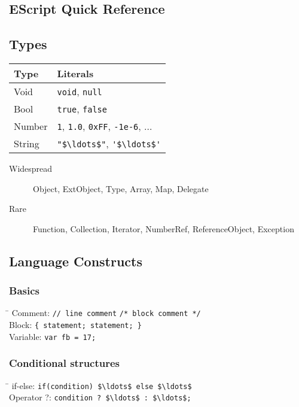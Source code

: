 \documentclass[paper=A4,paper=landscape,pagesize,9pt,DIV=30]{scrartcl}
\title{\doctitle}
\author{\docauthor}
\date{\today}
\def\doctitle{EScript Quick Reference}
\begin{document}
\begin{multicols}{3}
\section*{\doctitle}
\subsection*{Types}
\begin{tabular}{ll}
\toprule
Type		& Literals \\
\midrule
Void		& \lstinline!void!, \lstinline!null! \\
Bool		& \lstinline!true!, \lstinline!false! \\
Number		& \lstinline!1!, \lstinline!1.0!, \lstinline!0xFF!, \lstinline!-1e-6!, $\ldots$ \\
String		& \lstinline!"$\ldots$"!, \lstinline!'$\ldots$'! \\
\bottomrule
\end{tabular}
\begin{description}
	\item[Widespread] Object, ExtObject, Type, Array, Map, Delegate
	\item[Rare] Function, Collection, Iterator, NumberRef, ReferenceObject, Exception
\end{description}
\subsection*{Language Constructs}
\subsubsection*{Basics}
\begin{tabbing}
\hspace{1.75cm}\=\kill
Comment:		\>\lstinline!// line comment! \lstinline!/* block comment */! \\
Block:			\>\lstinline!{ statement; statement; }! \\
Variable:		\>\lstinline!var fb = 17;!
\end{tabbing}
\subsubsection*{Conditional structures}
\begin{tabbing}
\hspace{1.75cm}\=\kill
if-else:		\>\lstinline!if(condition) $\ldots$ else $\ldots$! \\
Operator ?: 	\>\lstinline!condition ? $\ldots$ : $\ldots$;!
\end{tabbing}

\end{multicols}
\end{document}
